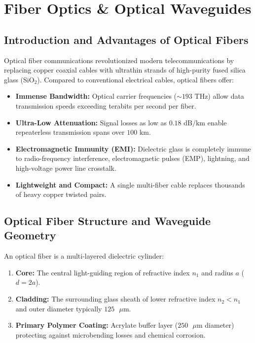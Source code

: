 \chapter{Fiber Optics \& Optical Waveguides}

\section{Introduction and Advantages of Optical Fibers}
Optical fiber communications revolutionized modern telecommunications by replacing copper coaxial cables with ultrathin strands of high-purity fused silica glass ($\text{SiO}_2$). Compared to conventional electrical cables, optical fibers offer:
\begin{itemize}[itemsep=2pt]
    \item \textbf{Immense Bandwidth:} Optical carrier frequencies ($\sim 193\text{ THz}$) allow data transmission speeds exceeding terabits per second per fiber.
    \item \textbf{Ultra-Low Attenuation:} Signal losses as low as $0.18\text{ dB/km}$ enable repeaterless transmission spans over $100\text{ km}$.
    \item \textbf{Electromagnetic Immunity (EMI):} Dielectric glass is completely immune to radio-frequency interference, electromagnetic pulses (EMP), lightning, and high-voltage power line crosstalk.
    \item \textbf{Lightweight and Compact:} A single multi-fiber cable replaces thousands of heavy copper twisted pairs.
\end{itemize}

\section{Optical Fiber Structure and Waveguide Geometry}
An optical fiber is a multi-layered dielectric cylinder:
\begin{enumerate}[itemsep=2pt]
    \item \textbf{Core:} The central light-guiding region of refractive index $n_1$ and radius $a$ ($d = 2a$).
    \item \textbf{Cladding:} The surrounding glass sheath of lower refractive index $n_2 < n_1$ and outer diameter typically $125\text{ }\mu\text{m}$.
    \item \textbf{Primary Polymer Coating:} Acrylate buffer layer ($250\text{ }\mu\text{m}$ diameter) protecting against microbending losses and chemical corrosion.
\end{enumerate}

